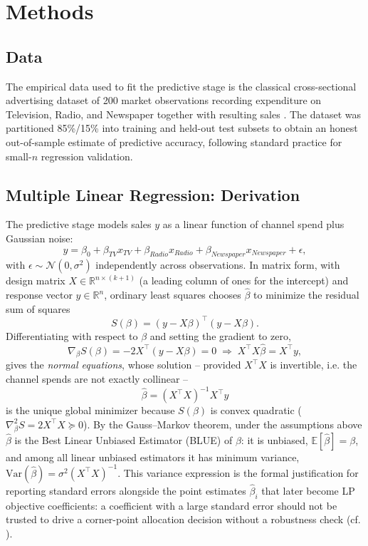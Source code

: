 \documentclass[conference]{IEEEtran}
\begin{document}
\section{Methods}

\subsection{Data}
The empirical data used to fit the predictive stage is the classical cross-sectional advertising dataset of 200 market observations recording expenditure on Television, Radio, and Newspaper together with resulting sales \cite{islr_2013}. The dataset was partitioned 85\%/15\% into training and held-out test subsets to obtain an honest out-of-sample estimate of predictive accuracy, following standard practice for small-$n$ regression validation.

\subsection{Multiple Linear Regression: Derivation}
The predictive stage models sales $y$ as a linear function of channel spend plus Gaussian noise:
\begin{equation}
y = \beta_0 + \beta_{TV}x_{TV} + \beta_{Radio}x_{Radio} + \beta_{Newspaper}x_{Newspaper} + \epsilon,
\label{eq:regmodel}
\end{equation}
with $\epsilon \sim \mathcal{N}(0,\sigma^2)$ independently across observations. In matrix form, with design matrix $X \in \mathbb{R}^{n\times(k+1)}$ (a leading column of ones for the intercept) and response vector $y \in \mathbb{R}^{n}$, ordinary least squares chooses $\hat\beta$ to minimize the residual sum of squares
\begin{equation}
S(\beta) = (y - X\beta)^\top (y - X\beta).
\end{equation}
Differentiating with respect to $\beta$ and setting the gradient to zero,
\begin{equation}
\nabla_\beta S(\beta) = -2X^\top(y - X\beta) = 0 \;\Longrightarrow\; X^\top X\hat\beta = X^\top y,
\end{equation}
gives the \emph{normal equations}, whose solution -- provided $X^\top X$ is invertible, i.e. the channel spends are not exactly collinear --
\begin{equation}
\hat\beta = (X^\top X)^{-1}X^\top y
\label{eq:normaleq}
\end{equation}
is the unique global minimizer because $S(\beta)$ is convex quadratic ($\nabla^2_\beta S = 2X^\top X \succeq 0$). By the Gauss--Markov theorem, under the assumptions above $\hat\beta$ is the Best Linear Unbiased Estimator (BLUE) of $\beta$: it is unbiased, $\mathbb{E}[\hat\beta]=\beta$, and among all linear unbiased estimators it has minimum variance, $\mathrm{Var}(\hat\beta) = \sigma^2(X^\top X)^{-1}$. This variance expression is the formal justification for reporting standard errors alongside the point estimates $\hat\beta_i$ that later become LP objective coefficients: a coefficient with a large standard error should not be trusted to drive a corner-point allocation decision without a robustness check (cf. \cite{robust_lp_2025}).
\end{document}
